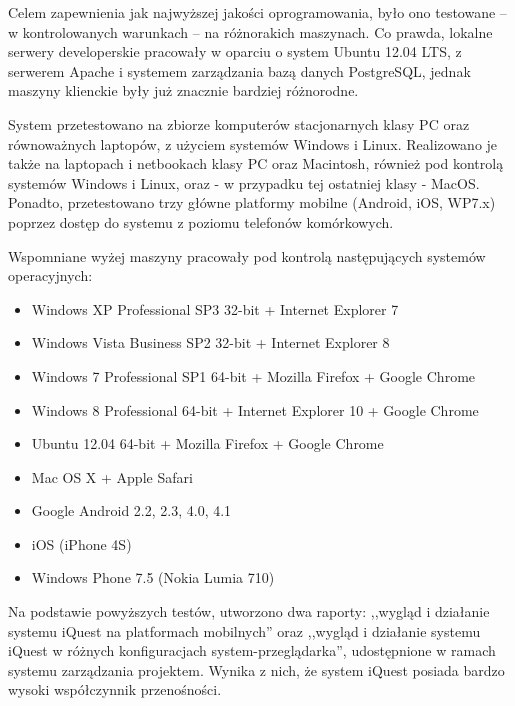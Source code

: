Celem zapewnienia jak najwyższej jakości oprogramowania, było ono testowane -- w kontrolowanych warunkach -- na różnorakich maszynach. Co prawda, lokalne serwery developerskie pracowały w oparciu o system Ubuntu 12.04 LTS, z serwerem Apache i systemem zarządzania bazą danych PostgreSQL, jednak maszyny klienckie były już znacznie bardziej różnorodne.

System przetestowano na zbiorze komputerów stacjonarnych klasy PC oraz równoważnych laptopów, z użyciem systemów Windows i Linux. Realizowano je także na laptopach i netbookach klasy PC oraz Macintosh, również pod kontrolą systemów Windows i Linux, oraz - w przypadku tej ostatniej klasy - MacOS. Ponadto, przetestowano trzy główne platformy mobilne (Android, iOS, WP7.x) poprzez dostęp do systemu z poziomu telefonów komórkowych.

Wspomniane wyżej maszyny pracowały pod kontrolą następujących systemów operacyjnych:
\begin{itemize}
\item{Windows XP Professional SP3 32-bit + Internet Explorer 7}
\item{Windows Vista Business SP2 32-bit + Internet Explorer 8}
\item{Windows 7 Professional SP1 64-bit + Mozilla Firefox + Google Chrome}
\item{Windows 8 Professional 64-bit + Internet Explorer 10 + Google Chrome}
\item{Ubuntu 12.04 64-bit + Mozilla Firefox + Google Chrome}
\item{Mac OS X + Apple Safari}
\item{Google Android 2.2, 2.3, 4.0, 4.1}
\item{iOS (iPhone 4S)}
\item{Windows Phone 7.5 (Nokia Lumia 710)}
\end{itemize}

Na podstawie powyższych testów, utworzono dwa raporty: ,,wygląd i działanie systemu iQuest na platformach mobilnych'' oraz ,,wygląd i działanie systemu iQuest w różnych konfiguracjach system-przeglądarka'', udostępnione w ramach systemu zarządzania projektem\cite{Redmine:ProjDocs}. Wynika z nich, że system iQuest posiada bardzo wysoki współczynnik przenośności.